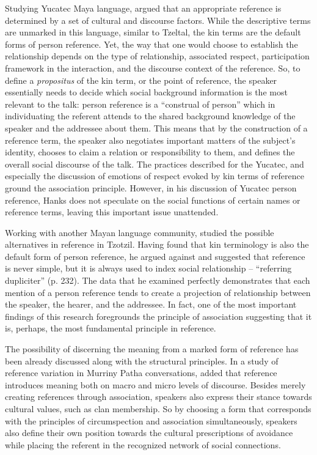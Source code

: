 \documentclass[12pt]{article}
\begin{document}
Studying Yucatec Maya language, \textcite{hanks2007} argued that an appropriate reference is determined by a set of cultural and discourse factors. While the descriptive terms are unmarked in this language, similar to Tzeltal, the kin terms are the default forms of person reference. Yet, the way that one would choose to establish the relationship depends on the type of relationship, associated respect, participation framework in the interaction, and the discourse context of the reference. So, to define a \textit{propositus} of the kin term, or the point of reference, the speaker essentially needs to decide which social background information is the most relevant to the talk: person reference is a ``construal of person'' \parencite[p. 149]{hanks2007} which in individuating the referent attends to the shared background knowledge of the speaker and the addressee about them. This means that by the construction of a reference term, the speaker also negotiates important matters of the subject's identity, chooses to claim a relation or responsibility to them, and defines the overall social discourse of the talk. The practices described for the Yucatec, and especially the discussion of emotions of respect evoked by kin terms of reference ground the association principle. However, in his discussion of Yucatec person reference, Hanks does not speculate on the social functions of certain names or reference terms, leaving this important issue unattended.

Working with another Mayan language community, \textcite{haviland2007} studied the possible alternatives in reference in Tzotzil. Having found that kin terminology is also the default form of person reference, he argued against \textcite{schegloff1996b} and suggested that reference is never simple, but it is always used to index social relationship -- ``referring dupliciter'' (p. 232). The data that he examined perfectly demonstrates that each mention of a person reference tends to create a projection of relationship between the speaker, the hearer, and the addressee. In fact, one of the most important findings of this research foregrounds the principle of association suggesting that it is, perhaps, the most fundamental principle in reference.

The possibility of discerning the meaning from a marked form of reference has been already discussed along with the structural principles. In a study of reference variation in Murriny Patha conversations, \textcite{blythe2009} added that reference introduces meaning both on macro and micro levels of discourse. Besides merely creating references through association, speakers also express their stance towards cultural values, such as clan membership. So by choosing a form that corresponds with the principles of circumspection and association simultaneously, speakers also define their own position towards the cultural prescriptions of avoidance while placing the referent in the recognized network of social connections.
\end{document}
